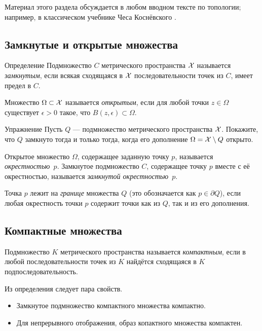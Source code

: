 Материал этого раздела обсуждается в любом вводном тексте по топологии;
например, в классическом учебнике Чеса Коснёвского \cite{kosniowski}.

\subsection*{Замкнутые и открытые множества}

\begin{thm}{Определение}
Подмножество $C$ метрического пространства $\mathcal{X}$ называется \emph{замкнутым}, если всякая сходящаяся в $\mathcal{X}$ последовательности точек из $C$, имеет предел в $C$.

Множество $\Omega \subset \mathcal{X}$ называется \emph{открытым}, если для любой точки $z\in \Omega$ 
существует $\epsilon>0$ такое, что $B(z,\epsilon)\subset\Omega$.
\end{thm}

\begin{thm}{Упражнение}\label{ex:close-open}
Пусть $Q$ --- подмножество метрического пространства $\mathcal{X}$.
Покажите, что $Q$ замкнуто тогда и только тогда, когда его дополнение $\Omega=\mathcal{X}\setminus Q$ открыто.
\end{thm}

Открытое множество $\Omega$, содержащее заданную точку $p$, называется \emph{окрестностью~$p$}.
Замкнутое подмножество $C$, содержащее точку $p$ вместе с её окрестностью, называется \emph{замкнутой окрестностью~$p$}.

Точка $p$ лежит на \emph{границе} множества $Q$ (это обозначается как $p\in\partial Q$), если любая окрестность точки $p$ содержит точки как из $Q$, так и из его дополнения.

\subsection*{Компактные множества}

{\sloppy
Подмножество $K$ метрического пространства называется \emph{компактным}, если в любой последовательности точек из $K$ найдётся сходящаяся в $K$ подпоследовательность.

}

Из определения следует пара свойств.

\begin{itemize}
\item Замкнутое подмножество компактного множества компактно.
\item Для непрерывного отображения, образ копактного множества компактен.
\end{itemize}


